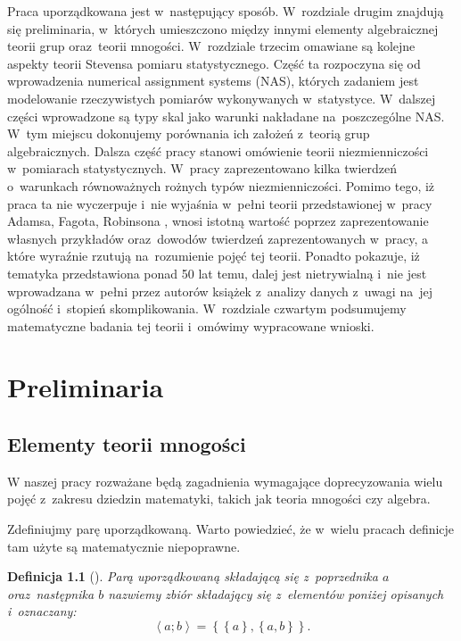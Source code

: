 \documentclass[12pt,a4paper]{report}
\newtheorem{definition}{Definicja}[chapter]
\newcommand{\parauporzadkowana}[2]{\left\langle {#1}; {#2} \right\rangle}
\newcommand{\zbior}[1]{\left\lbrace {#1} \right\rbrace }
\begin{document}
Praca uporządkowana jest w~następujący sposób. W~rozdziale drugim znajdują się preliminaria, w~których umieszczono między innymi elementy algebraicznej teorii grup oraz~teorii mnogości. W~rozdziale trzecim omawiane są kolejne aspekty teorii Stevensa pomiaru statystycznego. Część ta rozpoczyna się od wprowadzenia numerical assignment systems (NAS), których zadaniem jest modelowanie rzeczywistych pomiarów wykonywanych w~statystyce. W~dalszej części wprowadzone są typy skal jako warunki nakładane na~poszczególne NAS. W~tym miejscu dokonujemy porównania ich założeń z~teorią grup algebraicznych. Dalsza część pracy stanowi omówienie teorii niezmienniczości w~pomiarach statystycznych. W~pracy zaprezentowano kilka twierdzeń o~warunkach równoważnych rożnych typów niezmienniczości. Pomimo tego, iż praca ta nie wyczerpuje i~nie wyjaśnia w~pełni teorii przedstawionej w~pracy Adamsa, Fagota, Robinsona {\citep{adams1965theory}}, wnosi istotną wartość poprzez zaprezentowanie własnych przykładów oraz~dowodów twierdzeń zaprezentowanych w~pracy, a które wyraźnie rzutują na~rozumienie pojęć tej teorii. Ponadto pokazuje, iż tematyka przedstawiona ponad 50 lat temu, dalej jest nietrywialną i~nie jest wprowadzana w~pełni przez autorów książek z~analizy danych z~uwagi na~jej ogólność i~stopień skomplikowania. W~rozdziale czwartym podsumujemy  matematyczne badania tej teorii i~omówimy wypracowane wnioski.

\chapter{Preliminaria}


\section{Elementy teorii mnogości}
W naszej pracy rozważane będą zagadnienia wymagające doprecyzowania wielu pojęć z~zakresu dziedzin matematyki, takich jak teoria mnogości czy algebra. 


Zdefiniujmy parę uporządkowaną. Warto powiedzieć, że w~wielu pracach definicje tam użyte są matematycznie niepoprawne.

\begin{definition}[{\citep[Sec 3.3]{kuratowski1966wstkep}}]
Parą uporządkowaną składającą się z~poprzednika $a$ oraz~następnika $b$ nazwiemy zbiór składający się z~elementów poniżej opisanych i~oznaczany:
\begin{equation*}
\parauporzadkowana{a}{b}=\zbior{\zbior{a}, \zbior{a,b}}.
\end{equation*}

\end{definition}
\end{document}
